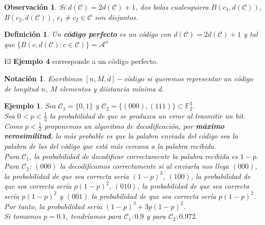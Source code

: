 \documentclass[spanish]{book}
\newtheorem{mydef}{Definición}
\newtheorem{nota}{Notación}
\newtheorem{ejem}{Ejemplo}
\newtheorem{obsv}{Observación}
\begin{document}
\begin{obsv}
	Si $d(\mathcal{C})=2d(\mathcal{C})+1$, dos bolas cualesquiera $B(c_1, d(\mathcal{C}))$, $B(c_2, d(\mathcal{C}))$, $c_1 \neq c_2 \in \mathcal{C}$ son disjuntos.
\end{obsv}

\begin{mydef}
	Un \textbf{código perfecto} es un código con $d(\mathcal{C})=2d(\mathcal{C})+1$ y tal que $\{B(c, d(\mathcal{C}): c \in \mathcal{C})\}=\mathcal{A}^n$
\end{mydef}
El \textbf{Ejemplo 4} corresponde a un código perfecto.

\begin{nota}
	Escribimos $[n, M, d]-código$ si queremos representar un código de longitud $n$, $M$ elementos y diistancia mínima $d$.
\end{nota}

\begin{ejem}
	Sea $\mathcal{C}_1=\{0, 1\}$ y $\mathcal{C}_2=\{(000), (111)\} \subset \mathbb{F}_2^3$. \\
	Sea $\displaystyle 0<p<\frac{1}{2}$ la probabilidad de que se produzca un error al trasmitir un bit. \\
	Como $\displaystyle p < \frac{1}{2}$ proponemos un algoritmo de decodificación, por \textbf{máximo verosimilitud}, lo más probable es que la palabra enviada del código sea la palabra de las del código que está más cercana a la palabra recibida. \\
	Para $\mathcal{C}_1$, la probabilidad de decodificar correctamente la palabra recibida es $1-p$. \\
	Para $\mathcal{C}_2$:
	 $(000)$ la decodificamos correctamente si al enviarla nos llega $(000)$, la probabilidad de que sea correcta sería $(1-p)^3$, $(100)$, la probabilidad de que sea correcta sería $p(1-p)^2$, $(010)$, la probabilidad de que sea correcta sería $p(1-p)^2$ y $(001)$  la probabilidad de que sea correcta sería $p(1-p)^2$. \\
	Por tanto, la probabilidad sería $(1 - p)^3 + 3 p (1 - p) ^2$. \\
	Si tomamos $p=0.1$, tendríamos para $\mathcal{C}_1: 0.9$ y para $\mathcal{C}_2: 0.972$.
\end{ejem}
\end{document}
